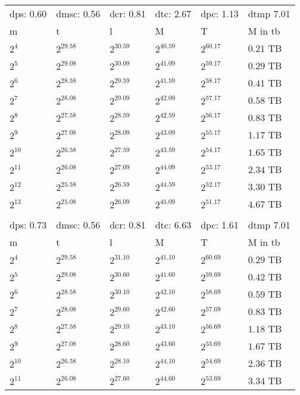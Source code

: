 \begin{tabular}{llllll}
dps: 0.60 & dmsc: 0.56 & dcr: 0.81 & dtc: 2.67 & dpc: 1.13 & dtmp 7.01 \\
m & t & l & M & T & M in tb \\
$2^{4}$ & $2^{29.58}$ & $2^{30.59}$ & $2^{40.59}$ & $2^{60.17}$ & $0.21$ TB \\
$2^{5}$ & $2^{29.08}$ & $2^{30.09}$ & $2^{41.09}$ & $2^{59.17}$ & $0.29$ TB \\
$2^{6}$ & $2^{28.58}$ & $2^{29.59}$ & $2^{41.59}$ & $2^{58.17}$ & $0.41$ TB \\
$2^{7}$ & $2^{28.08}$ & $2^{29.09}$ & $2^{42.09}$ & $2^{57.17}$ & $0.58$ TB \\
$2^{8}$ & $2^{27.58}$ & $2^{28.59}$ & $2^{42.59}$ & $2^{56.17}$ & $0.83$ TB \\
$2^{9}$ & $2^{27.08}$ & $2^{28.09}$ & $2^{43.09}$ & $2^{55.17}$ & $1.17$ TB \\
$2^{10}$ & $2^{26.58}$ & $2^{27.59}$ & $2^{43.59}$ & $2^{54.17}$ & $1.65$ TB \\
$2^{11}$ & $2^{26.08}$ & $2^{27.09}$ & $2^{44.09}$ & $2^{53.17}$ & $2.34$ TB \\
$2^{12}$ & $2^{25.58}$ & $2^{26.59}$ & $2^{44.59}$ & $2^{52.17}$ & $3.30$ TB \\
$2^{13}$ & $2^{25.08}$ & $2^{26.09}$ & $2^{45.09}$ & $2^{51.17}$ & $4.67$ TB \\
 &  &  &  &  &  \\
dps: 0.73 & dmsc: 0.56 & dcr: 0.81 & dtc: 6.63 & dpc: 1.61 & dtmp 7.01 \\
m & t & l & M & T & M in tb \\
$2^{4}$ & $2^{29.58}$ & $2^{31.10}$ & $2^{41.10}$ & $2^{60.69}$ & $0.29$ TB \\
$2^{5}$ & $2^{29.08}$ & $2^{30.60}$ & $2^{41.60}$ & $2^{59.69}$ & $0.42$ TB \\
$2^{6}$ & $2^{28.58}$ & $2^{30.10}$ & $2^{42.10}$ & $2^{58.69}$ & $0.59$ TB \\
$2^{7}$ & $2^{28.08}$ & $2^{29.60}$ & $2^{42.60}$ & $2^{57.69}$ & $0.83$ TB \\
$2^{8}$ & $2^{27.58}$ & $2^{29.10}$ & $2^{43.10}$ & $2^{56.69}$ & $1.18$ TB \\
$2^{9}$ & $2^{27.08}$ & $2^{28.60}$ & $2^{43.60}$ & $2^{55.69}$ & $1.67$ TB \\
$2^{10}$ & $2^{26.58}$ & $2^{28.10}$ & $2^{44.10}$ & $2^{54.69}$ & $2.36$ TB \\
$2^{11}$ & $2^{26.08}$ & $2^{27.60}$ & $2^{44.60}$ & $2^{53.69}$ & $3.34$ TB \\

\end{tabular}
